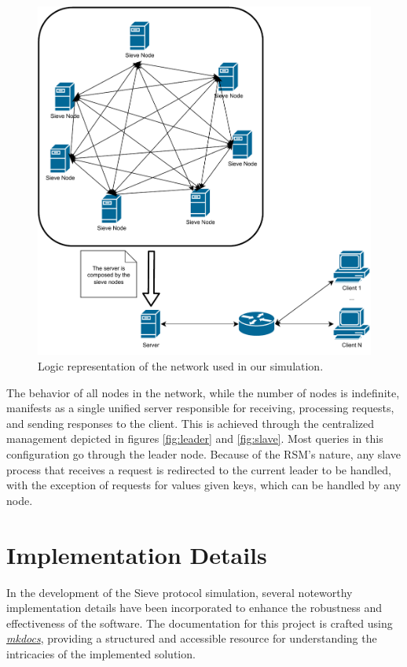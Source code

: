 \documentclass{scrartcl}
\begin{document}
\begin{figure}[H]
    \centering
    \includegraphics[width=1\linewidth]{figures/network.pdf}
    \caption{Logic representation of the network used in our simulation.}
    \label{fig:network}
\end{figure}

The behavior of all nodes in the network, while the number of nodes is indefinite, manifests as a single unified server responsible for receiving, processing requests, and sending responses to the client. This is achieved through the centralized management depicted in figures \ref{fig:leader} and \ref{fig:slave}. Most queries in this configuration go through the leader node. Because of the RSM's nature, any slave process that receives a request is redirected to the current leader to be handled, with the exception of requests for values given keys, which can be handled by any node.

\section{Implementation Details}

In the development of the Sieve protocol simulation, several noteworthy implementation details have been incorporated to enhance the robustness and effectiveness of the software. The documentation for this project is crafted using \href{https://www.mkdocs.org/}{\textit{mkdocs}}, providing a structured and accessible resource for understanding the intricacies of the implemented solution.
\end{document}
